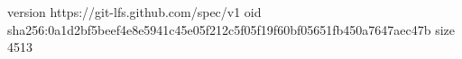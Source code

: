 version https://git-lfs.github.com/spec/v1
oid sha256:0a1d2bf5beef4e8e5941c45e05f212c5f05f19f60bf05651fb450a7647aec47b
size 4513
